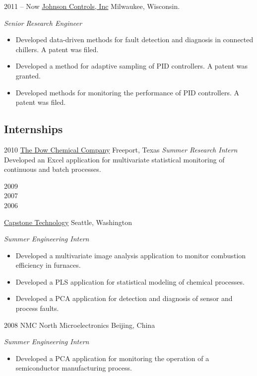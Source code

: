 \documentclass[]{../friggeri-cv} %
\begin{document}
\begin{entrylist}


\entry
{2011 -- Now}
{\href{http://www.johnsoncontrols.com}{Johnson Controls, Inc}}
{Milwaukee, Wisconsin.}
{
\emph{Senior Research Engineer}
\begin{itemize}
\item Developed data-driven methods for fault detection and diagnosis in connected chillers. A patent was filed.
\item Developed a method for adaptive sampling of PID controllers. A patent was granted.
\item Developed methods for monitoring the performance of PID controllers. A patent was filed.
\end{itemize}
}

\end{entrylist}

\subsection{Internships}

\begin{entrylist}

\entry
{2010}
{\href{http://www.dow.com/}{The Dow Chemical Company}}
{Freeport, Texas}
{\emph{Summer Research Intern} \\
Developed an Excel application for multivariate statistical monitoring of continuous and batch processes.}


\entry
{\begin{minipage}[t]{2cm}2009 \\ 2007 \\ 2006\end{minipage}}
{\href{http://www.capstonetechnology.com}{Capstone Technology}}
{Seattle, Washington}
{\emph{Summer Engineering Intern}
\begin{itemize}
	\item Developed a multivariate image analysis application to monitor combustion efficiency in furnaces.
	\item Developed a PLS application for statistical modeling of chemical processes.
	\item Developed a PCA application for detection and diagnosis of sensor and process faults.
\end{itemize}}


\entry
{2008}
{NMC North Microelectronics}
{Beijing, China}
{\emph{Summer Engineering Intern}
\begin{itemize}
	\item Developed a PCA application for monitoring the operation of a semiconductor manufacturing process.
\end{itemize}}





\end{entrylist}
\end{document}
